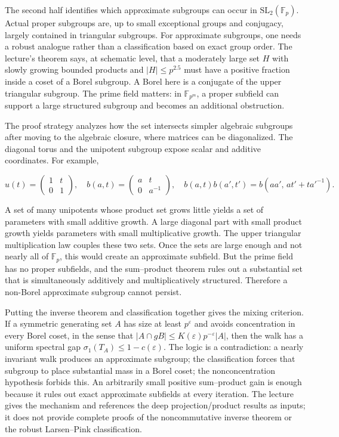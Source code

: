 The second half identifies which approximate subgroups can occur in \(\mathrm{SL}_2(\mathbb F_p)\). Actual proper subgroups are, up to small exceptional groups and conjugacy, largely contained in triangular subgroups. For approximate subgroups, one needs a robust analogue rather than a classification based on exact group order. The lecture's theorem says, at schematic level, that a moderately large set \(H\) with slowly growing bounded products and \(|H|\leq p^{2.5}\) must have a positive fraction inside a coset of a Borel subgroup. A Borel here is a conjugate of the upper triangular subgroup. The prime field matters: in \(\mathbb F_{p^m}\), a proper subfield can support a large structured subgroup and becomes an additional obstruction.

The proof strategy analyzes how the set intersects simpler algebraic subgroups after moving to the algebraic closure, where matrices can be diagonalized. The diagonal torus and the unipotent subgroup expose scalar and additive coordinates. For example,

\[ u(t)=\begin{pmatrix}1&t\\0&1\end{pmatrix},\quad b(a,t)=\begin{pmatrix}a&t\\0&a^{-1}\end{pmatrix},\quad b(a,t)b(a',t')=b(aa',\,at'+ta'^{-1}). \]

A set of many unipotents whose product set grows little yields a set of parameters with small additive growth. A large diagonal part with small product growth yields parameters with small multiplicative growth. The upper triangular multiplication law couples these two sets. Once the sets are large enough and not nearly all of \(\mathbb F_p\), this would create an approximate subfield. But the prime field has no proper subfields, and the sum--product theorem rules out a substantial set that is simultaneously additively and multiplicatively structured. Therefore a non-Borel approximate subgroup cannot persist.

Putting the inverse theorem and classification together gives the mixing criterion. If a symmetric generating set \(A\) has size at least \(p^\varepsilon\) and avoids concentration in every Borel coset, in the sense that \(|A\cap gB|\leq K(\varepsilon)p^{-\varepsilon}|A|\), then the walk has a uniform spectral gap \(\sigma_1(T_A)\leq1-c(\varepsilon)\). The logic is a contradiction: a nearly invariant walk produces an approximate subgroup; the classification forces that subgroup to place substantial mass in a Borel coset; the nonconcentration hypothesis forbids this. An arbitrarily small positive sum--product gain is enough because it rules out exact approximate subfields at every iteration. The lecture gives the mechanism and references the deep projection/product results as inputs; it does not provide complete proofs of the noncommutative inverse theorem or the robust Larsen--Pink classification.

